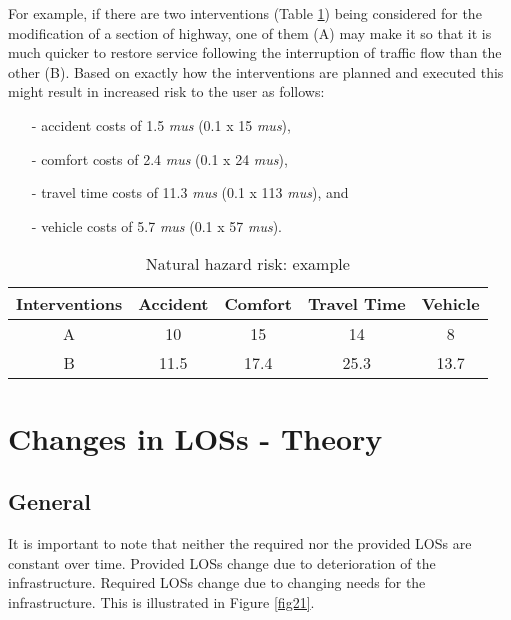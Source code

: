 For example, if there are two interventions (Table \ref{tbl:28}) being considered for the modification of a section of highway, one of them (A) may make it so that it is much quicker to restore service following the interruption of traffic flow than the other (B). Based on exactly how the interventions are planned and executed this might result in increased risk to the user as follows:

\begin{itemize}
	\item[-] accident costs of 1.5 \textit{mus} (0.1 x 15 \textit{mus}), 
	\item[-] comfort costs of 2.4 \textit{mus} (0.1 x 24 \textit{mus}),
	\item[-] travel time costs of 11.3 \textit{mus} (0.1 x 113 \textit{mus}), and
	\item[-] vehicle costs of 5.7 \textit{mus} (0.1 x 57 \textit{mus}).
\end{itemize}
\begin{table}
\caption{Natural hazard risk: example}
\begin{tabular}{|l|l|l|l|l|}
\hline
\multicolumn{1}{|c|}{Interventions} & \multicolumn{1}{c|}{Accident} & \multicolumn{1}{c|}{Comfort} & \multicolumn{1}{c|}{Travel Time} & \multicolumn{1}{c|}{Vehicle} \\ 
\hline
\multicolumn{1}{|c|}{A} & \multicolumn{1}{c|}{10} & \multicolumn{1}{c|}{15} & \multicolumn{1}{c|}{14} & \multicolumn{1}{c|}{8} \\ 
\hline
\multicolumn{1}{|c|}{B} & \multicolumn{1}{c|}{11.5} & \multicolumn{1}{c|}{17.4} & \multicolumn{1}{c|}{25.3} & \multicolumn{1}{c|}{13.7} \\ 
\hline
\end{tabular}
\label{tbl:28}
\end{table}
\section{Changes in LOSs - Theory}

\subsection{General}

It is important to note that neither the required nor the provided LOSs are constant over time. Provided LOSs change due to deterioration of the infrastructure. Required LOSs change due to changing needs for the infrastructure. This is illustrated in Figure \ref{fig21}.

